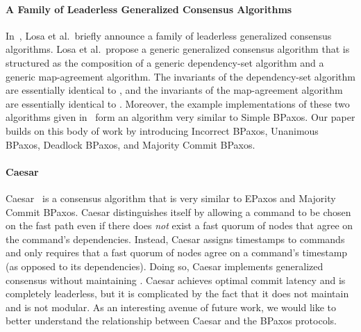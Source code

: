 \paragraph{A Family of Leaderless Generalized Consensus Algorithms}
In~\cite{losa2016brief}, Losa et al.\ briefly announce a family of leaderless
generalized consensus algorithms. Losa et al.\ propose a generic generalized
consensus algorithm that is structured as the composition of a generic
dependency-set algorithm and a generic map-agreement algorithm. The invariants
of the dependency-set algorithm are essentially identical to
, and the invariants of the map-agreement algorithm
are essentially identical to . Moreover, the example
implementations of these two algorithms given in~\cite{losa2016brief} form an
algorithm very similar to Simple BPaxos. Our paper builds on this body of work
by introducing Incorrect BPaxos, Unanimous BPaxos, Deadlock BPaxos, and
Majority Commit BPaxos.

\paragraph{Caesar}
Caesar~\cite{arun2017speeding} is a consensus algorithm that is very similar to
EPaxos and Majority Commit BPaxos. Caesar distinguishes itself by allowing a
command to be chosen on the fast path even if there does \emph{not} exist a
fast quorum of nodes that agree on the command's dependencies. Instead, Caesar
assigns timestamps to commands and only requires that a fast quorum of nodes
agree on a command's timestamp (as opposed to its dependencies). Doing so,
Caesar implements generalized consensus without maintaining
. Caesar achieves optimal commit latency and is
completely leaderless, but it is complicated by the fact that it does not
maintain  and is not modular. As an interesting
avenue of future work, we would like to better understand the relationship
between Caesar and the BPaxos protocols.

